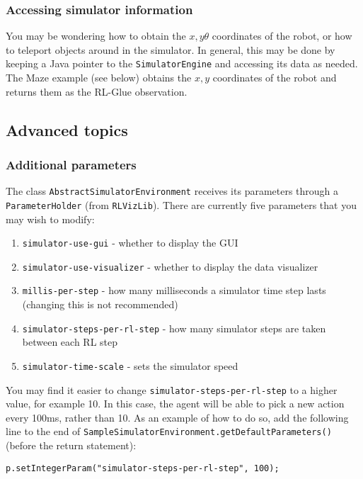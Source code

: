 \documentclass[12pt]{article}
\newcommand{\code}[1]{\texttt{#1}}
\begin{document}
\subsubsection{Accessing simulator information}

You may be wondering how to obtain the $x,y\theta$ coordinates of the robot,
or how to teleport objects around in the simulator. In general, this may be
done by keeping a Java pointer to the \code{SimulatorEngine} and accessing its
data as needed. The Maze example (see below) obtains the $x,y$ 
coordinates of the robot and returns them as the RL-Glue observation.

\subsection{Advanced topics}

\subsubsection{Additional parameters}

The class \code{AbstractSimulatorEnvironment} receives its parameters through
a \code{ParameterHolder} (from \code{RLVizLib}). There are currently five 
parameters that you may wish to modify:

\begin{enumerate}
\item{\code{simulator-use-gui} - whether to display the GUI}
\item{\code{simulator-use-visualizer} - whether to display the data visualizer}
\item{\code{millis-per-step} - how many milliseconds a simulator time step lasts (changing this is not recommended)}
\item{\code{simulator-steps-per-rl-step} - how many simulator steps are taken between each RL step}
\item{\code{simulator-time-scale} - sets the simulator speed} 
\end{enumerate}

You may find it easier to change \code{simulator-steps-per-rl-step} to a higher
value, for example 10. In this case, the agent will be able to pick a new
action every 100ms, rather than 10. As an example of how to do so, add
the following line to the end of 
\code{SampleSimulatorEnvironment.getDefaultParameters()} (before the return
statement):

\begin{verbatim}
p.setIntegerParam("simulator-steps-per-rl-step", 100);
\end{verbatim}
\end{document}
